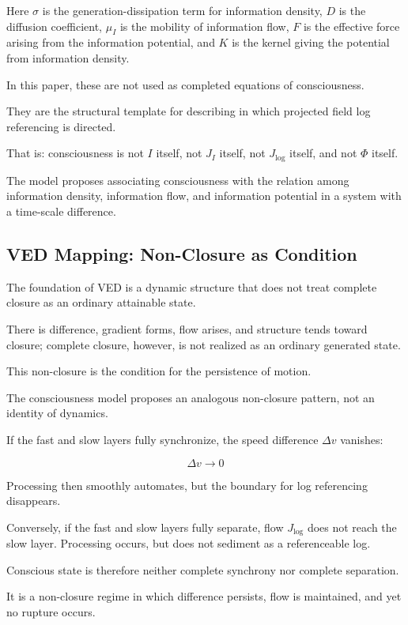 Here $\sigma$ is the generation-dissipation term for information density, $D$ is the diffusion coefficient, $\mu_I$ is the mobility of information flow, $F$ is the effective force arising from the information potential, and $K$ is the kernel giving the potential from information density.

In this paper, these are not used as completed equations of consciousness.

They are the structural template for describing in which projected field log referencing is directed.

That is: consciousness is not $I$ itself, not $J_I$ itself, not $J_{\log}$ itself, and not $\Phi$ itself.

The model proposes associating consciousness with the relation among information density, information flow, and information potential in a system with a time-scale difference.

\subsection{VED Mapping: Non-Closure as Condition}


The foundation of VED is a dynamic structure that does not treat complete closure as an ordinary attainable state.

There is difference, gradient forms, flow arises, and structure tends toward closure; complete closure, however, is not realized as an ordinary generated state.

This non-closure is the condition for the persistence of motion.

The consciousness model proposes an analogous non-closure pattern, not an identity of dynamics.

If the fast and slow layers fully synchronize, the speed difference $\Delta v$ vanishes:

\begin{equation}
\Delta v \rightarrow 0
\end{equation}

Processing then smoothly automates, but the boundary for log referencing disappears.

Conversely, if the fast and slow layers fully separate, flow $J_{\log}$ does not reach the slow layer. Processing occurs, but does not sediment as a referenceable log.

Conscious state is therefore neither complete synchrony nor complete separation.

It is a non-closure regime in which difference persists, flow is maintained, and yet no rupture occurs.

